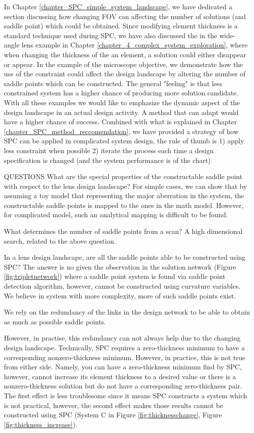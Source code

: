 In Chapter \ref{chapter_SPC_simple_system_landscape}, we have dedicated a section discussing how changing FOV can affecting the number of solutions (and saddle point) which could be obtained. Since modifying element thickness is a standard technique used during SPC, we have also discussed the in the wide-angle lens example in Chapter \ref{chapter_4_complex_system_exploration}, where when changing the thickness of the an element, a solution could either disappear or appear. In the example of the microscope objective, we demonstrate how the use of the constraint could affect the design landscape by altering the number of saddle points which can be constructed. The general "feeling" is that less constrained system has a higher chance of producing more solution candidate. 
With all these examples we would like to emphasize the dynamic aspect of the design landscape in an actual design activity. 
A method that can adapt would have a higher chance of success. Combined with what is explained in Chapter \ref{chapter_SPC_method_reccomendation}, we have provided a strategy of how SPC can be applied in complicated system design, the rule of thumb is 
1) apply less constraint when possible 
2) iterate the process each time a design specification is changed (and the system performance is of the chart)




QUESTIONS
What are the special properties of the constructable saddle point with respect to the lens design landscape? For simple cases, we can show that by assuming a toy model that representing the major aberration in the system, the constructable saddle points is mapped to the ones in the math model. However, for complicated model, such an analytical mapping is difficult to be found.  

What determines the number of saddle points from a scan?
A high dimensional search, related to the above question.

In a lens design landscape, are all the saddle points able to be constructed using SPC? The answer is no given the observation in the solution network (Figure \ref{fig:tripletnetwork}) where a saddle point system is found via saddle point detection algorithm, however, cannot be constructed using curvature variables. We believe in system with more complexity, more of such saddle points exist. 

We rely on the redundancy of the links in the design network to be able to obtain as much as possible saddle points. 

However, in practise, this redundancy can not always help due to the changing design landscape.
Technically, SPC requires a zero-thickness minimum to have a corresponding nonzero-thickness minimum. However, in practice, this is not true from either side. Namely, you can have a zero-thickness minimum find by SPC, however, cannot increase its element thickness to a desired value or there is a nonzero-thickness solution but do not have a corresponding zero-thickness pair. The first effect is less troublesome since it means SPC constructs a system which is not practical, however, the second effect makes those results cannot be constructed using SPC (System C in Figure \ref{fig:thicknesschange}, Figure \ref{fig:thickness_increase}).  

